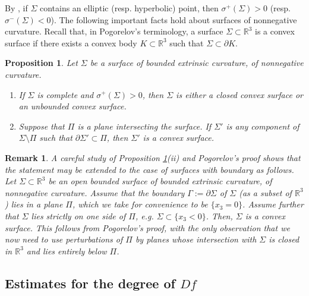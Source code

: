 \documentclass[12pt]{article}
\newcommand{\R}{\mathbb{R}}
\theoremstyle{plain}
\newtheorem{proposition}[theorem]{Proposition}
\newtheorem{remark}[theorem]{Remark}
\numberwithin{equation}{section}
\begin{document}
By \cite[Theorem 12, p. 600]{pogorelov_73}, if $\Sigma$ contains an elliptic (resp. hyperbolic) point, then $\sigma^+(\Sigma) > 0$ (resp. $\sigma^-(\Sigma) < 0$). The following important facts hold about surfaces of nonnegative curvature. Recall that, in Pogorelov's terminology, a surface $\Sigma \subset \R^3$ is a convex surface if there exists a convex body $K \subset \R^3$ such that $\Sigma \subset \partial K$.

\begin{proposition}{\cite[Theorems 1 and 2, p. 613, 615]{pogorelov_73}} \label{prop:pog_convexity}
Let $\Sigma$ be a surface of bounded extrinsic curvature, of nonnegative curvature.
\begin{enumerate}
    \item[(i)] If $\Sigma$ is complete and $\sigma^+(\Sigma) > 0$, then $\Sigma$ is either a closed convex surface or an unbounded convex surface. 
    \item[(ii)] Suppose that $\Pi$ is a plane intersecting the surface. If $\Sigma'$ is any component of $\Sigma \setminus\Pi$ such that $\partial \Sigma' \subset \Pi$, then $\Sigma'$ is a convex surface.
\end{enumerate}    
\end{proposition}

\begin{remark} \label{rem:pog_convex_cap}
    A careful study of Proposition \ref{prop:pog_convexity}(ii) and Pogorelov's proof shows that the statement may be extended to the case of surfaces with boundary as follows. Let $\Sigma \subset \R^3$ be an open bounded surface of bounded extrinsic curvature, of nonnegative curvature. Assume that the boundary $\Gamma := \partial \Sigma$ of $\Sigma$ (as a subset of $\R^3$) lies in a plane $\Pi$, which we take for convenience to be $\{x_3 = 0\}$. Assume further that  $\Sigma$ lies strictly on one side of $\Pi$, e.g. $\Sigma \subset \{x_3 < 0\}$. Then, $\Sigma$ is a convex surface. This follows from Pogorelov's proof, with the only observation that we now need to use perturbations of $\Pi$ by planes whose intersection with $\Sigma$ is closed in $\R^3$ and lies entirely below $\Pi$. 
\end{remark}

\subsection{Estimates for the degree of $Df$} \label{sec:deg_estimates}
\end{document}
